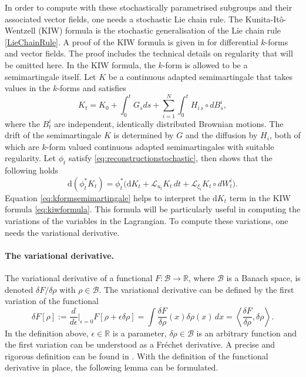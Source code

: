 \documentclass[11pt, oneside]{article}   	%
\numberwithin{equation}{section}
\theoremstyle{plain}
\theoremstyle{definition}
\theoremstyle{remark}
\newcommand{\<}{\langle}
\renewcommand{\>}{\rangle}
\def\rmd{{\mathrm{d}}}
\begin{document}
In order to compute with these stochastically parametrised subgroups and their associated vector fields, one needs a stochastic Lie chain rule. The Kunita-It\^o-Wentzell (KIW) formula is the stochastic generalisation of the Lie chain rule \eqref{LieChainRule}. A proof of the KIW formula is given  in \cite{de2020implications} for differential $k$-forms and vector fields. The proof includes the technical details on regularity that will be omitted here. In the KIW formula, the $k$-form is allowed to be a semimartingale itself. Let $K$ be a continuous adapted semimartingale that takes values in the $k$-forms and satisfies 
\begin{equation}
K_t = K_0 + \int_0^t G_s ds + \sum_{i=1}^N\int_0^t H_{i\,s}\circ dB_s^i,
\label{eq:kformsemimartingale}
\end{equation}
where the $B_t^i$ are independent, identically distributed Brownian motions. The drift of the semimartingale $K$ is determined by $G$ and the diffusion by $H_i$, both of which are $k$-form valued continuous adapted semimartingales with suitable regularity. Let $\phi_t$ satisfy \eqref{eq:reconstructionstochastic}, then \cite{de2020implications} shows that the following holds
\begin{equation}
{\rmd}(\phi_t^*K_t) = \phi_t^*\big({\rmd}K_t + \mathcal{L}_{u_t} K_t\,dt + \mathcal{L}_{\xi_i}K_t \circ dW_t^i\big).
\label{eq:kiwformula}
\end{equation}
Equation \eqref{eq:kformsemimartingale} helps to interpret the ${\rmd}K_t$ term in the KIW formula \eqref{eq:kiwformula}. This formula will be particularly useful in computing the variations of the variables in the Lagrangian. To compute these variations, one needs the variational derivative. 

\paragraph{The variational derivative.} The variational derivative of a functional $F:\mathcal{B}\to\mathbb{R}$, where $\mathcal{B}$ is a Banach space, is denoted $\delta F/\delta \rho$ with $\rho\in\mathcal{B}$. The variational derivative can be defined by the first variation of the functional
\begin{equation}
\delta F[\rho]:= \frac{d}{d\epsilon}\Big|_{\epsilon=0} F[\rho+\epsilon \delta\rho] = \int \frac{\delta F}{\delta \rho}(x)\delta\rho(x)\,dx = \left\langle\frac{\delta F}{\delta \rho},\delta \rho\right\rangle.
\end{equation}
In the definition above, $\epsilon\in\mathbb{R}$ is a parameter, $\delta\rho\in\mathcal{B}$ is an arbitrary function and the first variation can be understood as a Fr\'echet derivative. A precise and rigorous definition can be found in \cite{gelfand2000calculus}. With the definition of the functional derivative in place, the following lemma can be formulated.
\medskip
\end{document}
